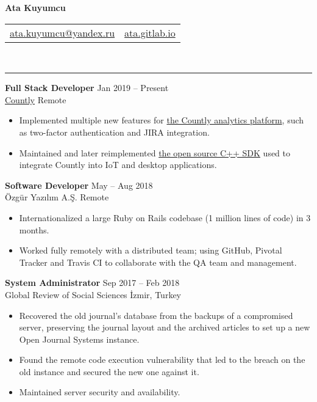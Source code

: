 \documentclass[a4paper, 11pt]{article}
\newcommand{\resumeSection}[1]{\vspace{12pt}{\Large \bfseries #1} \vspace{-9pt} \\ \rule{\textwidth}{0.7pt}}
\newcommand{\resumeSubsection}[1]{\textbf{#1}}
\begin{document}
	\begin{center}
		{\huge \bfseries Ata Kuyumcu}

		\begin{tabular}{c c}
			\href{mailto:ata.kuyumcu@yandex.ru}{ata.kuyumcu@yandex.ru} &
			\href{https://ata.gitlab.io}{ata.gitlab.io}
			
		\end{tabular}
	\end{center}

	\vspace{-20pt}
	\medskip
	\resumeSection{Experience}
	
	\resumeSubsection{Full Stack Developer} \hfill Jan 2019  – Present \\
	\href{https://count.ly}{Countly} \hfill Remote
	
	\begin{itemize}
		\item Implemented multiple new features for \href{https://github.com/Countly/countly-server}{the Countly analytics platform}, such as two-factor authentication and JIRA integration.
		\item Maintained and later reimplemented \href{https://github.com/Countly/countly-sdk-cpp}{the open source C++ SDK} used to integrate Countly into IoT and desktop applications.
	\end{itemize}

	\resumeSubsection{Software Developer} \hfill May – Aug 2018 \\
	Özgür Yazılım A.Ş. \hfill Remote
		
	\begin{itemize}
		\item Internationalized a large Ruby on Rails codebase (1 million lines of code) in 3 months.
		\item Worked fully remotely with a distributed team; using GitHub, Pivotal Tracker and Travis CI to collaborate with the QA team and management.
	\end{itemize}

	\resumeSubsection{System Administrator} \hfill Sep 2017 – Feb 2018 \\
	Global Review of Social Sciences \hfill İzmir, Turkey

	\begin{itemize}
		\item Recovered the old journal’s database from the backups of a compromised server, preserving the journal layout and the archived articles to set up a new Open Journal Systems instance.
		\item Found the remote code execution vulnerability that led to the breach on the old instance and secured the new one against it.
		\item Maintained server security and availability.
	\end{itemize}
	
\end{document}
